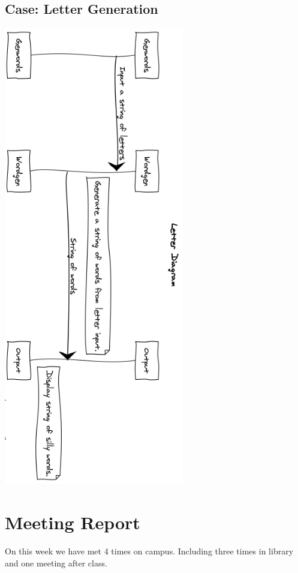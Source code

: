 \documentclass[12pt]{article}
\begin{document}
	\subsection{Case: Letter Generation}
	\includegraphics[width = .5\textwidth]{seqdia.PNG}

\section{Meeting Report}

\par
On this week we have met 4 times on campus. Including three times in library and one meeting after class. \\
\end{document}
